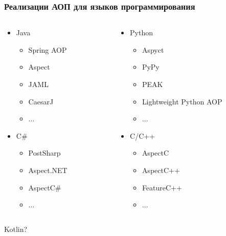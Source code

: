 \documentclass[hyperref={pdftex,unicode}]{beamer}
\begin{document}
\begin{frame}[fragile=singleslide]
	\frametitle{Реализации АОП для языков программирования}
	\begin{columns}
		\begin{column}{0.5\textwidth}
			\begin{itemize}
				\item Java
				      \begin{itemize}
				      	\item Spring AOP
				      	\item Aspect
				      	\item JAML
				      	\item CaesarJ
				      	\item ...
				      \end{itemize}
				\item C\#
				      \begin{itemize}
				      	\item PostSharp
				      	\item Aspect.NET
				      	\item AspectC\#
				      	\item ...
				      \end{itemize}
			\end{itemize}
		\end{column}
		\begin{column}{0.5\textwidth}  %
			\begin{itemize}
				\item Python
				      \begin{itemize}
				      	\item Aspyct
				      	\item PyPy
				      	\item PEAK
				      	\item Lightweight Python AOP
				      	\item ...
				      \end{itemize}
				      
				\item C/C++
				      \begin{itemize}
				      	\item AspectC
				      	\item AspectC++
				      	\item FeatureC++
				      	\item ...
				      \end{itemize}
				      
			\end{itemize}
		\end{column}
	\end{columns}

	\begin{center}
	\Huge Kotlin?
	\end{center}
				
\end{frame}
\end{document}
